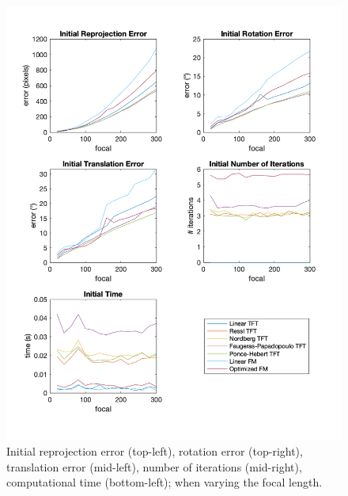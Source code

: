 \begin{figure}[p]
	\centering
	\includegraphics[width=1\textwidth]{Experiments/Synthetic/focal/INITfocalPlots.png}
	\caption[Synthetic Trial varying Focal Length]{Initial reprojection error (top-left), rotation error (top-right), translation error (mid-left), number of iterations (mid-right), computational time (bottom-left); when varying the focal length.}
	\label{fig:initFocalPlot}
\end{figure}

